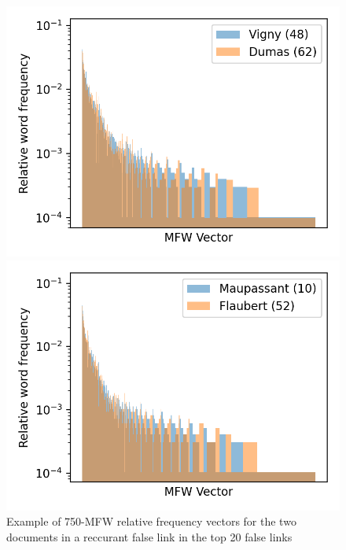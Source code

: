 \begin{figure}
  \centering
  \caption{Example of 750-MFW relative frequency vectors for the two documents in a reccurant false link in the top 20 false links}
  \label{fig:mfw_vector_error}

  \label{fig:mfw_vector_error_0}
  \includegraphics[width=\linewidth]{img/mfw_vector_error_0.png}

  \label{fig:mfw_vector_error_1}
  \includegraphics[width=\linewidth]{img/mfw_vector_error_1.png}
\end{figure}

